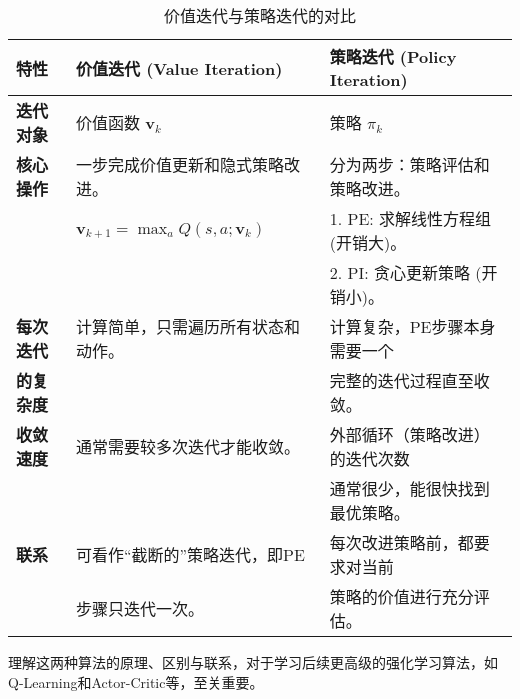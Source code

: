 \documentclass[12pt, a4paper]{article}
\newcommand{\vect}[1]{\mathbf{#1}} %
\begin{document}
\begin{table}[h!]
\centering
\caption{价值迭代与策略迭代的对比}
\label{tab:comparison}
\begin{tabular}{lll}
\toprule
\textbf{特性} & \textbf{价值迭代 (Value Iteration)} & \textbf{策略迭代 (Policy Iteration)} \\
\midrule
\textbf{迭代对象} & 价值函数 $\vect{v}_k$ & 策略 $\pi_k$ \\
\addlinespace
\textbf{核心操作} & 一步完成价值更新和隐式策略改进。 & 分为两步：策略评估和策略改进。 \\
& $\vect{v}_{k+1} = \max_a Q(s,a; \vect{v}_k)$ & 1. PE: 求解线性方程组 (开销大)。\\
& & 2. PI: 贪心更新策略 (开销小)。\\
\addlinespace
\textbf{每次迭代} & 计算简单，只需遍历所有状态和动作。 & 计算复杂，PE步骤本身需要一个\\
\textbf{的复杂度} & & 完整的迭代过程直至收敛。 \\
\addlinespace
\textbf{收敛速度} & 通常需要较多次迭代才能收敛。 & 外部循环（策略改进）的迭代次数\\
& & 通常很少，能很快找到最优策略。\\
\addlinespace
\textbf{联系} & 可看作“截断的”策略迭代，即PE & 每次改进策略前，都要求对当前\\
& 步骤只迭代一次。 & 策略的价值进行充分评估。\\
\bottomrule
\end{tabular}
\end{table}

理解这两种算法的原理、区别与联系，对于学习后续更高级的强化学习算法，如Q-Learning和Actor-Critic等，至关重要。
\end{document}
